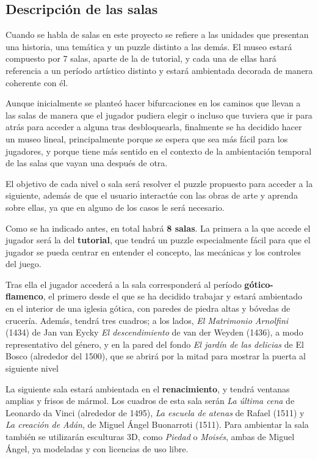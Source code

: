 \subsection{Descripción de las salas}

Cuando se habla de salas en este proyecto se refiere a las unidades que presentan una historia, una temática y un puzzle distinto a las demás. El museo estará compuesto por 7 salas, aparte de la de tutorial, y cada una de ellas hará referencia a un período artístico distinto y estará ambientada  decorada de manera coherente con él.

Aunque inicialmente se planteó hacer bifurcaciones en los caminos que llevan a las salas de manera que el jugador pudiera elegir o incluso que tuviera que ir para atrás para acceder a alguna tras desbloquearla, finalmente se ha decidido hacer un museo lineal, principalmente porque se espera que sea más fácil para los jugadores, y porque tiene más sentido en el contexto de la ambientación temporal de las salas que vayan una después de otra.

El objetivo de cada nivel o sala será resolver el puzzle propuesto para acceder a la siguiente, además de que el usuario interactúe con las obras de arte y aprenda sobre ellas, ya que en alguno de los casos le será necesario.

Como se ha indicado antes, en total habrá \textbf{8 salas}. La primera a la que accede el jugador será la del \textbf{tutorial}, que tendrá un puzzle especialmente fácil para que el jugador se pueda centrar en entender el concepto, las mecánicas y los controles del juego.

Tras ella el jugador accederá a la sala corresponderá al período \textbf{gótico-flamenco}, el primero desde el que se ha decidido trabajar y estará ambientado en el interior de una iglesia gótica, con paredes de piedra altas y bóvedas de crucería. Además, tendrá tres cuadros; a los lados, \textit{El Matrimonio Arnolfini} (1434)  de Jan van Eycky \textit{El descendimiento} de van der Weyden (1436), a modo representativo del género, y en la pared del fondo \textit{El jardín de las delicias} de El Bosco (alrededor del 1500), que se abrirá por la mitad para mostrar la puerta al siguiente nivel

La siguiente sala estará ambientada en el \textbf{renacimiento}, y tendrá ventanas amplias y frisos de mármol. Los cuadros de esta sala serán \textit{La última cena} de Leonardo da Vinci (alrededor de 1495), \textit{La escuela de atenas} de Rafael (1511) y \textit{La creación de Adán}, de Miguel Ángel Buonarroti (1511). Para ambientar la sala también se utilizarán esculturas 3D, como \textit{Piedad} o \textit{Moisés}, ambas de Miguel Ángel, ya modeladas y con licencias de uso libre.

